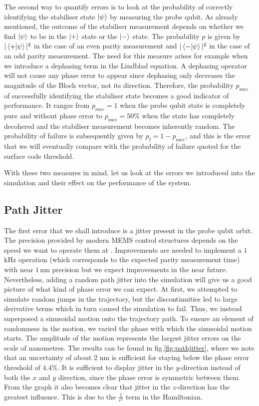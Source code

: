 The second way to quantify errors is to look at the probability of correctly identifying the stabiliser state  $\ket{\psi}$ by measuring the probe qubit. As already mentioned, the outcome of the stabiliser measurement depends on whether we find $\ket{\psi}$ to be in the $\ket{+}$ state or the $\ket{-}$ state. The probability $p$ is given by $|\left\langle +|\psi \right\rangle|^2$ in the case of an even parity measurement and $|\left\langle - |\psi \right\rangle|^2$ in the case of an odd parity measurement. The need for this measure arises for example when we introduce a dephasing term in the Lindblad equation. A dephasing operator will not cause any phase error to appear since dephasing only decreases the magnitude of the Bloch vector, not its direction. Therefore, the probability $p_{\mathrm{succ}}$ of successfully identifying the stabiliser state becomes a good indicator of performance. It ranges from $p_{\mathrm{succ}} = 1$ when the probe qubit state is completely pure and without phase error to $p_{\mathrm{succ}} = 50 \%$ when the state has completely decohered and the stabiliser measurement becomes inherently random. The probability of failure is subsequently given by $p_{\mathrm{f}} =1- p_{\mathrm{succ}} $, and this is the error that we will eventually compare with the probability of failure quoted for the surface code threshold. 

With these two measures in mind, let us look at the errors we introduced into the simulation and their effect on the performance of the system. 




\subsection{Path Jitter}\label{sec:jitter}
The first error that we shall introduce is a jitter present in the probe qubit orbit. The precision provided by modern MEMS control structures depends on the speed we want to operate them at \cite{Chu2003,Koo2012}. Improvements are needed to implement a $1\, $kHz operation (which corresponds to the expected parity measurement time) with near $1\, $nm precision but we expect improvements in the near future. Nevertheless, adding a random path jitter into the simulation will give us a good picture of what kind of phase error we can expect. At first, we attempted to simulate random jumps in the trajectory, but the discontinuities led to large derivative terms which in turn caused the simulation to fail. Thus,  we instead superposed a sinusoidal motion onto the trajectory path. To ensure an element of randomness in the motion, we varied the phase with which the sinusoidal motion starts. The amplitude of the motion represents the largest jitter errors on the scale of nanometres. The results can be found in fig.\@ \ref{fig:pathjitter}, where we note that an uncertainty of about 2 nm is sufficient for staying below the phase error threshold of $4.4 \%$.  It is sufficient to display jitter in the $y$-direction instead of both the $x$ and $y$ direction, since the phase error is symmetric between them. 
From the graph it also becomes clear that jitter in the $z$-direction has the greatest influence. This is due to the $\frac{1}{r^3}$  term in the Hamiltonian.



